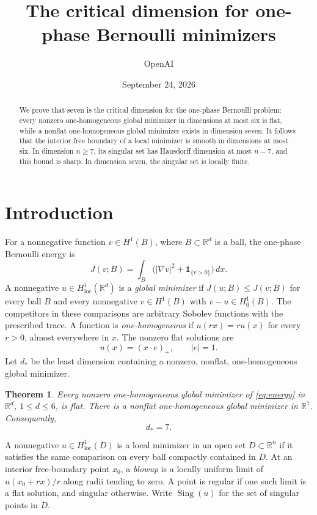 \documentclass[11pt]{article}
\title{The critical dimension for one-phase Bernoulli minimizers}
\author{OpenAI}
\date{September 24, 2026}
\newcommand{\R}{\mathbb R}
\newtheorem{theorem}{Theorem}[section]
\theoremstyle{definition}
\theoremstyle{remark}
\numberwithin{equation}{section}
\begin{document}
\maketitle
\begin{abstract}
We prove that seven is the critical dimension for the one-phase Bernoulli
problem: every nonzero one-homogeneous global minimizer in dimensions at most
six is flat, while a nonflat one-homogeneous global minimizer exists in
dimension seven. It follows that the interior free boundary of a local
minimizer is smooth in dimensions at most six. In dimension $n\ge7$, its
singular set has Hausdorff dimension at most $n-7$, and this bound is sharp.
In dimension seven, the singular set is locally finite.
\end{abstract}

\section{Introduction}\label{sec:introduction}
For a nonnegative function \(v\in H^1(B)\), where \(B\subset\R^d\) is a ball,
the one-phase Bernoulli energy is
\begin{equation}\label{eq:energy}
  J(v;B)=\int_B\bigl(|\nabla v|^2+\mathbf 1_{\{v>0\}}\bigr)\,dx.
\end{equation}
A nonnegative \(u\in H^1_{\mathrm{loc}}(\R^d)\) is a \emph{global minimizer}
if \(J(u;B)\leq J(v;B)\) for every ball \(B\) and every nonnegative
\(v\in H^1(B)\) with \(v-u\in H^1_0(B)\).
The competitors in these comparisons are arbitrary Sobolev functions with
the prescribed trace.
A function is \emph{one-homogeneous} if \(u(rx)=r u(x)\) for every \(r>0\),
almost everywhere in \(x\).
The nonzero flat solutions are
\[
  u(x)=(x\cdot e)_+,\qquad |e|=1.
\]
Let \(d_*\) be the least dimension containing a nonzero, nonflat,
one-homogeneous global minimizer.

\begin{theorem}\label{thm:main}
Every nonzero one-homogeneous global minimizer of \eqref{eq:energy}
in \(\R^d\), \(1\leq d\leq6\), is flat. There is a nonflat
one-homogeneous global minimizer in \(\R^7\). Consequently,
\[
  d_*=7.
\]
\end{theorem}

A nonnegative $u\in H^1_{\mathrm{loc}}(D)$ is a local minimizer in an open
set $D\subset\R^n$ if it satisfies the same
comparison on every ball compactly contained in $D$. At an interior
free-boundary point $x_0$, a \emph{blowup} is a locally uniform limit of
$u(x_0+rx)/r$ along radii tending to zero. A point is regular if one such
limit is a flat solution, and singular otherwise. Write $\operatorname{Sing}(u)$
for the set of singular points in $D$.
\end{document}
